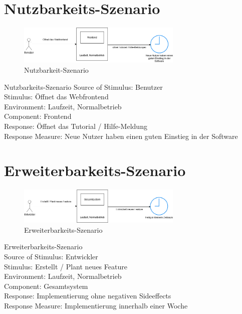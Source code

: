 \section{Nutzbarkeits-Szenario}
\begin{figure}[tbh]
  \centering
  \includegraphics[width=0.7\textwidth]{Graphics/Nutzbarkeit.png}
  \caption{Nutzbarkeit-Szenario}
  \label{fig:Qualitaet3}
\end{figure}



Nutzbarkeits-Szenario
Source of Stimulus: Benutzer\\
Stimulus: Öffnet das Webfrontend\\
Environment: Laufzeit, Normalbetrieb\\
Component: Frontend\\
Response: Öffnet das Tutorial / Hilfe-Meldung\\
Response Measure: Neue Nutzer haben einen guten Einstieg in der Software\\




\section{Erweiterbarkeits-Szenario}
\begin{figure}[tbh]
  \centering
  \includegraphics[width=0.7\textwidth]{Graphics/Erweiterbarkeit.png}
  \caption{Erweiterbarkeits-Szenario}
  \label{fig:Qualitaet3}
\end{figure}


Erweiterbarkeits-Szenario\\
Source of Stimulus: Entwickler\\
Stimulus: Erstellt / Plant neues Feature\\
Environment: Laufzeit, Normalbetrieb\\
Component: Gesamtsystem\\
Response: Implementierung ohne negativen Sideeffects\\
Response Measure: Implementierung innerhalb einer Woche \\


